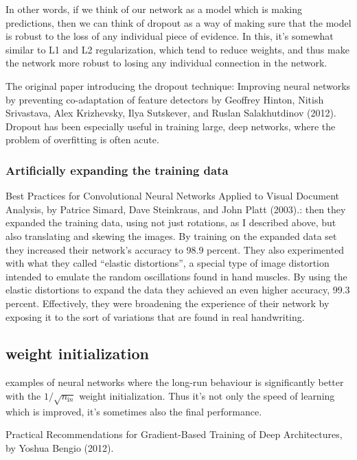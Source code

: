 \documentclass[]{book}
\begin{document}
In other words, if we think of our network as a model which is making
predictions, then we can think of dropout as a way of making sure that
the model is robust to the loss of any individual piece of evidence. In
this, it's somewhat similar to L1 and L2 regularization, which tend to
reduce weights, and thus make the network more robust to losing any
individual connection in the network.

The original paper introducing the dropout technique: Improving neural
networks by preventing co-adaptation of feature detectors by Geoffrey
Hinton, Nitish Srivastava, Alex Krizhevsky, Ilya Sutskever, and Ruslan
Salakhutdinov (2012). Dropout has been especially useful in training
large, deep networks, where the problem of overfitting is often acute.

\subsubsection{Artificially expanding the training
data}\label{artificially-expanding-the-training-data}

Best Practices for Convolutional Neural Networks Applied to Visual
Document Analysis, by Patrice Simard, Dave Steinkraus, and John Platt
(2003).: then they expanded the training data, using not just rotations,
as I described above, but also translating and skewing the images. By
training on the expanded data set they increased their network's
accuracy to 98.9 percent. They also experimented with what they called
``elastic distortions'', a special type of image distortion intended to
emulate the random oscillations found in hand muscles. By using the
elastic distortions to expand the data they achieved an even higher
accuracy, 99.3 percent. Effectively, they were broadening the experience
of their network by exposing it to the sort of variations that are found
in real handwriting.

\subsection{weight initialization}\label{weight-initialization}

examples of neural networks where the long-run behaviour is
significantly better with the \(1/\sqrt{n_{\mathrm in}}\) weight
initialization. Thus it's not only the speed of learning which is
improved, it's sometimes also the final performance.

Practical Recommendations for Gradient-Based Training of Deep
Architectures, by Yoshua Bengio (2012).
\end{document}
